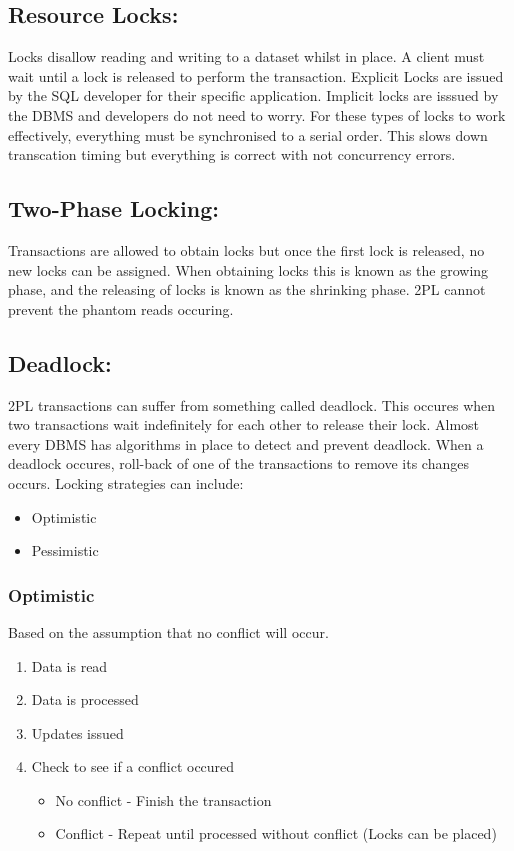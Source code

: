 \documentclass[a5paper]{article}
\begin{document}
	\subsection{Resource Locks:}
	Locks disallow reading and writing to a dataset whilst in place. A client must wait until a lock is released to perform the transaction. Explicit Locks are issued by the SQL developer for their specific application. Implicit locks are isssued by the DBMS and developers do not need to worry. For these types of locks to work effectively, everything must be synchronised to a serial order. This slows down transcation timing but everything is correct with not concurrency errors.
	\subsection{Two-Phase Locking:}
	Transactions are allowed to obtain locks but once the first lock is released, no new locks can be assigned. When obtaining locks this is known as the growing phase, and the releasing of locks is known as the shrinking phase. 2PL cannot prevent the phantom reads occuring.
	\subsection{Deadlock:}
	2PL transactions can suffer from something called deadlock. This occures when two transactions wait indefinitely for each other to release their lock. Almost every DBMS has algorithms in place to detect and prevent deadlock. When a deadlock occures, roll-back of one of the transactions to remove its changes occurs. Locking strategies can include:
	\begin{itemize}
		\item Optimistic
		\item Pessimistic
	\end{itemize}
	\subsubsection{Optimistic}
	Based on the assumption that no conflict will occur.
	\begin{enumerate}
		\item Data is read
		\item Data is processed
		\item Updates issued
		\item Check to see if a conflict occured
		\begin{itemize}
			\item No conflict - Finish the transaction
			\item Conflict - Repeat until processed without conflict (Locks can be placed)
		\end{itemize}
	\end{enumerate}
\end{document}
